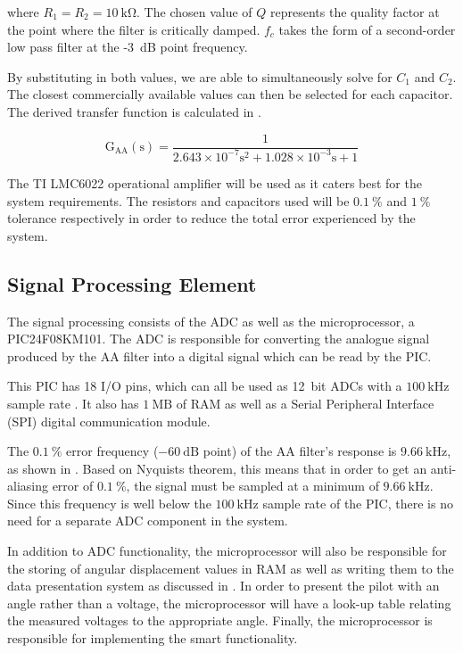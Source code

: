 \documentclass[10pt,twocolumn]{witseiepaper}
\begin{document}
where $R_1 = R_2 = 10~\mathrm{k\Omega}$. The chosen value of $Q$ represents the quality factor at the point where the filter is critically damped. $f_c$ takes the form of a second-order low pass filter at the -3~dB point frequency.

By substituting in both values, we are able to simultaneously solve for $C_1$ and $C_2$. The closest commercially available values can then be selected for each capacitor. The derived transfer function is calculated in .

\begin{equation}
\mathrm{G_{AA}(s) = \frac{1}{2.643 \times 10^{-7} s^2 + 1.028 \times 10^{-3} s + 1} }
\label{eqn:aafilter}
\end{equation}

The TI LMC6022 operational amplifier will be used as it caters best for the system requirements. The resistors and capacitors used will be $0.1~\%$ and $1~\%$ tolerance respectively in order to reduce the total error experienced by the system.

\subsection{Signal Processing Element}

The signal processing consists of the ADC as well as the microprocessor, a PIC24F08KM101. The ADC is responsible for converting the analogue signal produced by the AA filter into a digital signal which can be read by the PIC.

This PIC has 18 I/O pins, which can all be used as 12~bit ADCs with a $100~\mathrm{kHz}$ sample rate \cite{PIC}. It also has $1~\mathrm{MB}$ of RAM as well as a Serial Peripheral Interface (SPI) digital communication module.

The $0.1~\%$ error frequency ($-60~\mathrm{dB}$ point) of the AA filter's response is $9.66~\mathrm{kHz}$, as shown in . Based on Nyquists theorem, this means that in order to get an anti-aliasing error of $0.1~\%$, the signal must be sampled at a minimum of $9.66~\mathrm{kHz}$. Since this frequency is well below the $100~\mathrm{kHz}$ sample rate of the PIC, there is no need for a separate ADC component in the system.  

In addition to ADC functionality, the microprocessor will also be responsible for the storing of angular displacement values in RAM as well as writing them to the data presentation system as discussed in . In order to present the pilot with an angle rather than a voltage, the microprocessor will have a look-up table relating the measured voltages to the appropriate angle. Finally, the microprocessor is responsible for implementing the smart functionality.
\end{document}
